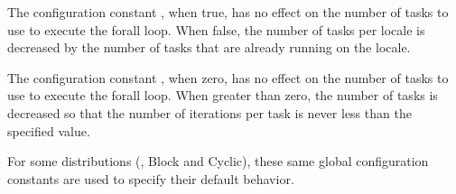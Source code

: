 The configuration constant , when
true, has no effect on the number of tasks to use to execute the
forall loop.  When false, the number of tasks per locale is decreased
by the number of tasks that are already running on the locale.

The configuration constant , when zero,
has no effect on the number of tasks to use to execute the forall
loop.  When greater than zero, the number of tasks is decreased so
that the number of iterations per task is never less than the
specified value.

For some distributions (\eg, Block and Cyclic), these same global
configuration constants are used to specify their default behavior.
